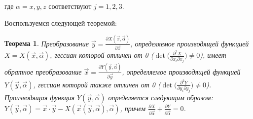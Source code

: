 \documentclass[12pt]{article}
\newtheorem{mytheorem}{Теорема}[]
\begin{document}
где $\alpha = x,y,z$ соответствуют $j=1,2,3$.

Воспользуемся следующей теоремой:

\begin{mytheorem}
Преобразование $\vec{y} = \frac{\partial X(\vec{x}, \vec{\alpha})}{\partial \vec{x}}$, определяемое производящей функцией $X = X(\vec{x}, \vec{\alpha})$, гессиан которой отличен от 0 ($\det \bigl( \frac{\partial ^2 X}{\partial x_i \partial x_j} \bigr) \neq 0$), имеет обратное преобразование $\vec{x} = \frac{\partial Y(\vec{y}, \vec{\alpha})}{\partial \vec{y}}$, определяемое производящей функцией $Y(\vec{y}, \vec{\alpha})$, гессиан которой также отличен от 0 ($\det \bigl( \frac{\partial ^2 Y}{\partial y_i \partial y_j} \bigr) \neq 0$). Производящая функция $Y(\vec{y}, \vec{\alpha})$ определяется следующим образом: $Y(\vec{y}, \vec{\alpha}) = \vec{x} \cdot \vec{y} - X(\vec{x}(\vec{y}, \vec{\alpha}), \vec{\alpha})$, причем $\frac{\partial X}{\partial \vec{\alpha}} + \frac{\partial Y}{\partial \vec{\alpha}} = 0$.
\end{mytheorem}
\end{document}
